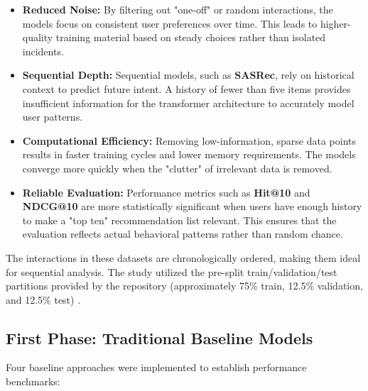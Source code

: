 \documentclass[conference]{IEEEtran}
\begin{document}
\begin{itemize}
    \item \textbf{Reduced Noise:} By filtering out "one-off" or random interactions, the models focus on consistent user preferences over time. This leads to higher-quality training material based on steady choices rather than isolated incidents.
    \item \textbf{Sequential Depth:} Sequential models, such as \textbf{SASRec}, rely on historical context to predict future intent. A history of fewer than five items provides insufficient information for the transformer architecture to accurately model user patterns.
    \item \textbf{Computational Efficiency:} Removing low-information, sparse data points results in faster training cycles and lower memory requirements. The models converge more quickly when the "clutter" of irrelevant data is removed.
    \item \textbf{Reliable Evaluation:} Performance metrics such as \textbf{Hit@10} and \textbf{NDCG@10} are more statistically significant when users have enough history to make a "top ten" recommendation list relevant. This ensures that the evaluation reflects actual behavioral patterns rather than random chance.
\end{itemize}

The interactions in these datasets are chronologically ordered, making them ideal for sequential analysis. The study utilized the pre-split train/validation/test partitions provided by the repository (approximately 75\% train, 12.5\% validation, and 12.5\% test) \cite{b21}.

\subsection{First Phase: Traditional Baseline Models}

Four baseline approaches were implemented to establish performance benchmarks:
\end{document}
